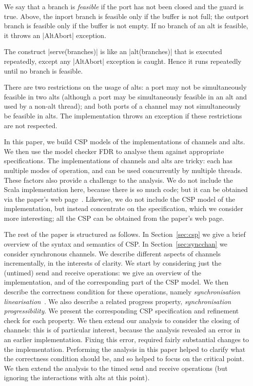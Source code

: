 We say that a branch is \emph{feasible} if the port has not been closed and
the guard is true.  Above, the inport branch is feasible only if the buffer is
not full; the outport branch is feasible only if the buffer is not empty.  If
no branch of an alt is feasible, it throws an |AltAbort| exception. 

The construct |serve(branches)| is like an |alt(branches)| that is executed
repeatedly, except any |AltAbort| exception is caught.  Hence it runs
repeatedly until no branch is feasible. 

There are two restrictions on the usage of alts: a port may not be
simultaneously feasible in two alts (although a port may be simultaneously
feasible in an alt and used by a non-alt thread); and both ports of a channel
may not simultaneously be feasible in alts.  The implementation throws an
exception if these restrictions are not respected.

In this paper, we build CSP models of the implementations of channels and
alts.  We then use the model checker FDR to analyse them against appropriate
specifications. 
%
The implementations of channels and alts are tricky: each has multiple modes
of operation, and can be used concurrently by multiple threads.  These factors
also provide a challenge to the analysis.
%
We do not include the Scala implementation here, because there is so much
code; but it can be obtained via the paper's web page~.
Likewise, we do not include the CSP model of the implementation, but instead
concentrate on the specification, which we consider more interesting; all the
CSP can be obtained from the paper's web page.

The rest of the paper is structured as follows.  In Section~\ref{sec:csp} we
give a brief overview of the syntax and semantics of CSP\@.  In
Section~\ref{sec:syncchan} we consider synchronous channels.  We describe
different aspects of channels incrementally, in the interests of clarity.  We
start by considering just the (untimed) send and receive operations: we give
an overview of the implementation, and of the corresponding part of the CSP
model.  We then describe the correctness condition for these operations,
namely \emph{synchronisation linearisation}~\cite{LL:synchronisation}.  We
also describe a related progress property, \emph{synchronisation
  progressibility}.  We present the corresponding CSP specification and
refinement check for each property.  We then extend our analysis to consider
the closing of channels: this is of particular interest, because the analysis
revealed an error in an earlier implementation.  Fixing this error, required
fairly substantial changes to the implementation.  Performing the analysis in
this paper helped to clarify what the correctness condition should be, and so
helped to focus on the critical point.  We then extend the analysis to the
timed send and receive operations (but ignoring the interactions with alts at
this point).


